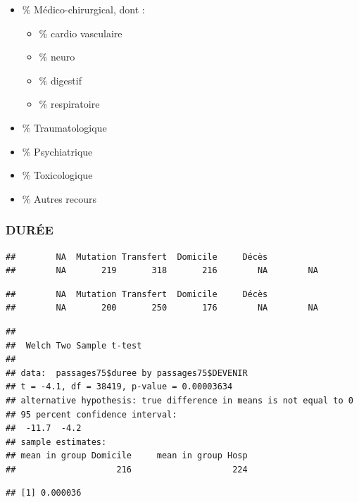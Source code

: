 \documentclass[]{article}
\begin{document}
\begin{itemize}
\itemsep1pt\parskip0pt
\item
  \% Médico-chirurgical, dont :

  \begin{itemize}
  \itemsep1pt\parskip0pt
  \item
    \% cardio vasculaire
  \item
    \% neuro
  \item
    \% digestif
  \item
    \% respiratoire
  \end{itemize}
\item
  \% Traumatologique
\item
  \% Psychiatrique
\item
  \% Toxicologique
\item
  \% Autres recours
\end{itemize}

\subsubsection{DURÉE}\label{duree}

\begin{verbatim}
##        NA  Mutation Transfert  Domicile     Décès           
##        NA       219       318       216        NA        NA
\end{verbatim}

\begin{verbatim}
##        NA  Mutation Transfert  Domicile     Décès           
##        NA       200       250       176        NA        NA
\end{verbatim}

\begin{verbatim}
## 
##  Welch Two Sample t-test
## 
## data:  passages75$duree by passages75$DEVENIR
## t = -4.1, df = 38419, p-value = 0.00003634
## alternative hypothesis: true difference in means is not equal to 0
## 95 percent confidence interval:
##  -11.7  -4.2
## sample estimates:
## mean in group Domicile     mean in group Hosp 
##                    216                    224
\end{verbatim}

\begin{verbatim}
## [1] 0.000036
\end{verbatim}
\end{document}
